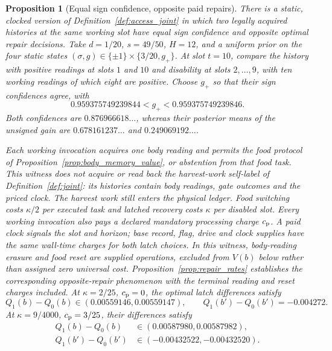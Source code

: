 \documentclass[12pt]{article}
\newtheorem{proposition}[theorem]{Proposition}
\theoremstyle{definition}
\begin{document}
\begin{proposition}[Equal sign confidence, opposite paid repairs]
\label{prop:repair_witness}
There is a static, clocked version of Definition~\ref{def:access_joint} in
which two legally acquired histories at the same working slot have equal
sign confidence and opposite optimal repair decisions. Take $d=1/20$,
$s=49/50$, $H=12$, and a uniform prior on the four static states
$(\sigma,g)\in\{\pm1\}\times\{3/20,g_+\}$. At slot $t=10$, compare the
history with positive readings at slots $1$ and $10$ and disability at
slots $2,\ldots,9$, with ten working readings of which eight are positive.
Choose $g_+$ so that their sign confidences agree, with
\[
 0.959375749239844<g_+<0.959375749239846.
\]
Both confidences are $0.876966618\ldots$, whereas their posterior means of the unsigned gain are
$0.678161237\ldots$ and $0.249069192\ldots$.

Each working invocation acquires one body reading and permits the food
protocol of Proposition~\ref{prop:body_memory_value}, or abstention from
that food task. This witness does not acquire or read back the harvest-work
self-label of Definition~\ref{def:joint}: its histories contain body
readings, gate outcomes and the priced clock. The harvest work still
enters the physical ledger. Food switching costs $\kappa/2$ per executed task and
latched recovery costs $\kappa$ per disabled slot. Every working invocation
also pays a declared mandatory processing charge $c_{\rm p}$. A paid clock
signals the slot and horizon; base record, flag, drive and clock supplies
have the same wall-time charges for both latch choices. In this witness,
body-reading erasure and food reset are supplied operations, excluded
from $V(b)$ below rather than assigned zero universal cost.
Proposition~\ref{prop:repair_rates} establishes the corresponding
opposite-repair phenomenon with the terminal reading and reset charges
included. At
$\kappa=2/25$, $c_{\rm p}=0$, the optimal latch differences satisfy
\[
 Q_1(b)-Q_0(b)\in(0.00559146,0.00559147),\qquad
 Q_1(b')-Q_0(b')=-0.004272.
\]
At $\kappa=9/4000$, $c_{\rm p}=3/25$, their differences satisfy
\[
\begin{aligned}
 Q_1(b)-Q_0(b)&\in(0.00587980,0.00587982),\\
 Q_1(b')-Q_0(b')&\in(-0.00432522,-0.00432520).
\end{aligned}
\]
\end{proposition}
\end{document}
